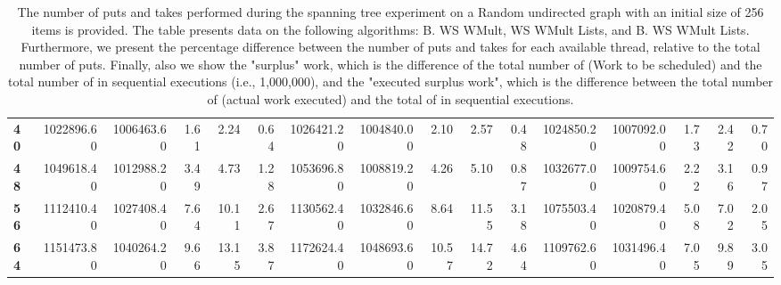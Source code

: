 \begin{table}[!ht]
{\begin{tabular}{lrrrrrrrrrrrrrrr}
\textbf{40} &  1022896.60 & 1006463.60 &           1.61 &        2.24 &                 0.64 &     1026421.20 & 1004840.00 &           2.10 &        2.57 &                 0.48 &        1024850.20 & 1007092.00 &           1.73 &        2.42 &                 0.70 \\
\textbf{48} &  1049618.40 & 1012988.20 &           3.49 &        4.73 &                 1.28 &     1053696.80 & 1008819.20 &           4.26 &        5.10 &                 0.87 &        1032677.00 & 1009754.60 &           2.22 &        3.16 &                 0.97 \\
\textbf{56} &  1112410.40 & 1027408.40 &           7.64 &       10.11 &                 2.67 &     1130562.40 & 1032846.60 &           8.64 &       11.55 &                 3.18 &        1075503.40 & 1020879.40 &           5.08 &        7.02 &                 2.05 \\
\textbf{64} &  1151473.80 & 1040264.20 &           9.66 &       13.15 &                 3.87 &     1172624.40 & 1048693.60 &          10.57 &       14.72 &                 4.64 &        1109762.60 & 1031496.40 &           7.05 &        9.89 &                 3.05 \\
\bottomrule
\end{tabular}}
\label{difference-Random_undirected-256-B_WS_NC_MULT_OPT-WS_NC_MULT_LA_OPT-B_WS_NC_MULT_LA_OPT}
\caption{The number of puts and takes performed during the
    spanning tree experiment on a Random undirected graph with an initial size
    of 256 items is provided. The table presents data on the
    following algorithms: B. WS WMult, WS WMult Lists, and
    B. WS WMult Lists. Furthermore, we present the percentage difference
    between the number of puts and takes for each available thread,
    relative to the total number of puts. Finally, also we show the
    "surplus" work, which is the difference of the total number of
    \Puts (Work to be scheduled) and the total number of \Puts in
    sequential executions (i.e., 1,000,000), and the "executed surplus
    work", which is the difference between the total number of \Takes
    (actual work executed) and the total of \Takes in sequential
    executions.}
\end{table}
